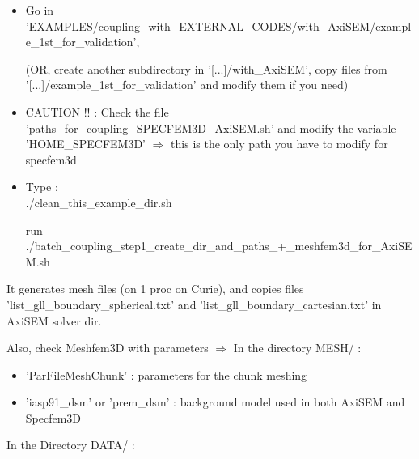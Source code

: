 \documentclass[11pt]{article}
\begin{document}
\begin{itemize}

\item[\textbullet] Go in 'EXAMPLES/coupling\_with\_EXTERNAL\_CODES/with\_AxiSEM/example\_1st\_for\_validation',

\smallskip

(OR, create another subdirectory in '[...]/with\_AxiSEM', copy files from '[...]/example\_1st\_for\_validation' and modify them if you need)

\item[\textbullet] {\color{red} CAUTION !! : Check the file 'paths\_for\_coupling\_SPECFEM3D\_AxiSEM.sh' and modify the variable 'HOME\_SPECFEM3D'} $\Longrightarrow$ this is the only path you have to modify for specfem3d

\item[\textbullet] Type : \\

\noindent ./clean\_this\_example\_dir.sh

\smallskip

\noindent run ./batch\_coupling\_step1\_create\_dir\_and\_paths\_+\_meshfem3d\_for\_AxiSEM.sh

\end{itemize}

\noindent It generates mesh files (on 1 proc on Curie), and copies files 'list\_gll\_boundary\_spherical.txt' and 'list\_gll\_boundary\_cartesian.txt' in AxiSEM solver dir.

\bigskip
\medskip

\noindent Also, check Meshfem3D with parameters $\Longrightarrow$ In the directory MESH/ :

\begin{itemize}

\item[\textbullet] 'ParFileMeshChunk'  : parameters for the chunk meshing

\item[\textbullet] 'iasp91\_dsm' or 'prem\_dsm' : background model used in both AxiSEM and Specfem3D

\end{itemize}

\bigskip

\noindent In the Directory DATA/ :
\end{document}
